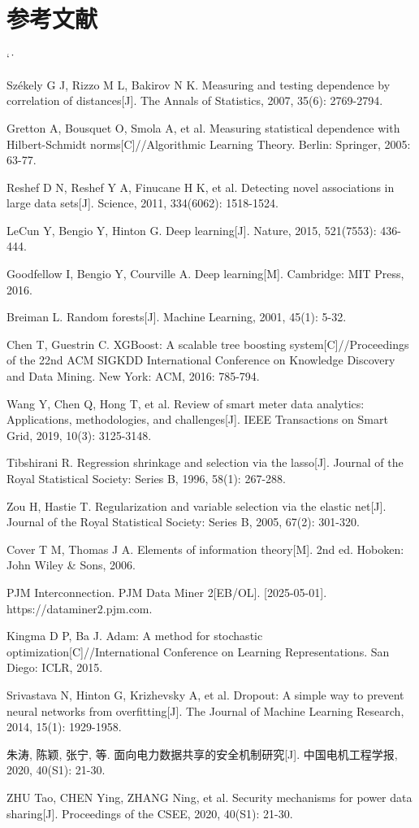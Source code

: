 \documentclass[UTF8,zihao=5,twoside]{ctexart}
\makeatletter
\numberwithin{equation}{section}
\renewcommand{\refname}{参考文献}
\renewenvironment{thebibliography}[1]{%
  \section*{\refname}%
  \small
  \list{[\arabic{enumi}]}{%
    \settowidth\labelwidth{[#1]}%
    \leftmargin\labelwidth
    \advance\leftmargin\labelsep
    \usecounter{enumi}}
  \sloppy\clubpenalty4000\widowpenalty4000\sfcode`\.\ \@m
}{\def\@noitemerr{\@latex@warning{Empty `thebibliography' environment}}\endlist}
\makeatother
\begin{document}
\begin{thebibliography}{99}
Székely G J, Rizzo M L, Bakirov N K. Measuring and testing dependence by correlation of distances[J]. The Annals of Statistics, 2007, 35(6): 2769-2794.

Gretton A, Bousquet O, Smola A, et al. Measuring statistical dependence with Hilbert-Schmidt norms[C]//Algorithmic Learning Theory. Berlin: Springer, 2005: 63-77.

Reshef D N, Reshef Y A, Finucane H K, et al. Detecting novel associations in large data sets[J]. Science, 2011, 334(6062): 1518-1524.

LeCun Y, Bengio Y, Hinton G. Deep learning[J]. Nature, 2015, 521(7553): 436-444.

Goodfellow I, Bengio Y, Courville A. Deep learning[M]. Cambridge: MIT Press, 2016.

Breiman L. Random forests[J]. Machine Learning, 2001, 45(1): 5-32.

Chen T, Guestrin C. XGBoost: A scalable tree boosting system[C]//Proceedings of the 22nd ACM SIGKDD International Conference on Knowledge Discovery and Data Mining. New York: ACM, 2016: 785-794.

Wang Y, Chen Q, Hong T, et al. Review of smart meter data analytics: Applications, methodologies, and challenges[J]. IEEE Transactions on Smart Grid, 2019, 10(3): 3125-3148.

Tibshirani R. Regression shrinkage and selection via the lasso[J]. Journal of the Royal Statistical Society: Series B, 1996, 58(1): 267-288.

Zou H, Hastie T. Regularization and variable selection via the elastic net[J]. Journal of the Royal Statistical Society: Series B, 2005, 67(2): 301-320.

Cover T M, Thomas J A. Elements of information theory[M]. 2nd ed. Hoboken: John Wiley \& Sons, 2006.

PJM Interconnection. PJM Data Miner 2[EB/OL]. [2025-05-01]. https://dataminer2.pjm.com.

Kingma D P, Ba J. Adam: A method for stochastic optimization[C]//International Conference on Learning Representations. San Diego: ICLR, 2015.

Srivastava N, Hinton G, Krizhevsky A, et al. Dropout: A simple way to prevent neural networks from overfitting[J]. The Journal of Machine Learning Research, 2014, 15(1): 1929-1958.

朱涛, 陈颖, 张宁, 等. 面向电力数据共享的安全机制研究[J]. 中国电机工程学报, 2020, 40(S1): 21-30.

ZHU Tao, CHEN Ying, ZHANG Ning, et al. Security mechanisms for power data sharing[J]. Proceedings of the CSEE, 2020, 40(S1): 21-30.
\end{thebibliography}
\end{document}

